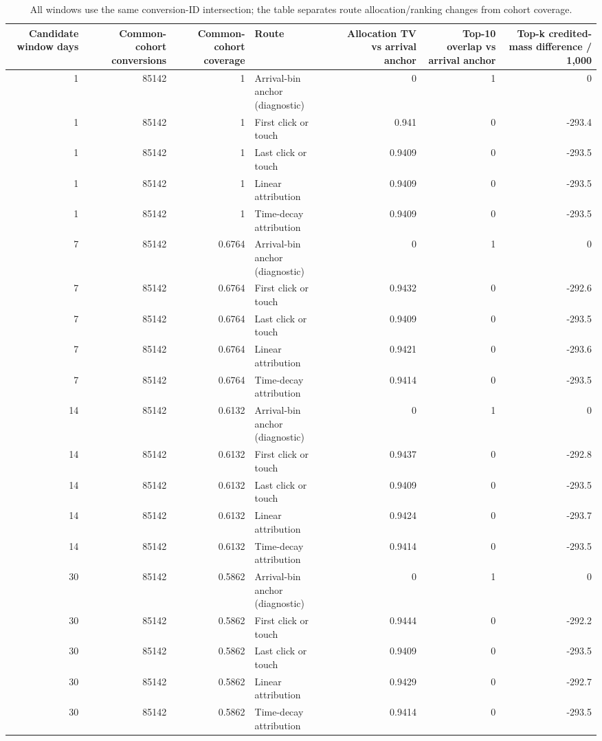 \begin{table}
\caption{All windows use the same conversion-ID intersection; the table separates route allocation/ranking changes from cohort coverage.}
\label{tab:app_exp2_candidate_window_sensitivity}
\begin{tabular}{rrrlrrr}
\toprule
Candidate window days & Common-cohort conversions & Common-cohort coverage & Route & Allocation TV vs arrival anchor & Top-10 overlap vs arrival anchor & Top-k credited-mass difference / 1,000 \\
\midrule
1 & 85142 & 1 & Arrival-bin anchor (diagnostic) & 0 & 1 & 0 \\
1 & 85142 & 1 & First click or touch & 0.941 & 0 & -293.4 \\
1 & 85142 & 1 & Last click or touch & 0.9409 & 0 & -293.5 \\
1 & 85142 & 1 & Linear attribution & 0.9409 & 0 & -293.5 \\
1 & 85142 & 1 & Time-decay attribution & 0.9409 & 0 & -293.5 \\
7 & 85142 & 0.6764 & Arrival-bin anchor (diagnostic) & 0 & 1 & 0 \\
7 & 85142 & 0.6764 & First click or touch & 0.9432 & 0 & -292.6 \\
7 & 85142 & 0.6764 & Last click or touch & 0.9409 & 0 & -293.5 \\
7 & 85142 & 0.6764 & Linear attribution & 0.9421 & 0 & -293.6 \\
7 & 85142 & 0.6764 & Time-decay attribution & 0.9414 & 0 & -293.5 \\
14 & 85142 & 0.6132 & Arrival-bin anchor (diagnostic) & 0 & 1 & 0 \\
14 & 85142 & 0.6132 & First click or touch & 0.9437 & 0 & -292.8 \\
14 & 85142 & 0.6132 & Last click or touch & 0.9409 & 0 & -293.5 \\
14 & 85142 & 0.6132 & Linear attribution & 0.9424 & 0 & -293.7 \\
14 & 85142 & 0.6132 & Time-decay attribution & 0.9414 & 0 & -293.5 \\
30 & 85142 & 0.5862 & Arrival-bin anchor (diagnostic) & 0 & 1 & 0 \\
30 & 85142 & 0.5862 & First click or touch & 0.9444 & 0 & -292.2 \\
30 & 85142 & 0.5862 & Last click or touch & 0.9409 & 0 & -293.5 \\
30 & 85142 & 0.5862 & Linear attribution & 0.9429 & 0 & -292.7 \\
30 & 85142 & 0.5862 & Time-decay attribution & 0.9414 & 0 & -293.5 \\
\bottomrule
\end{tabular}
\end{table}
